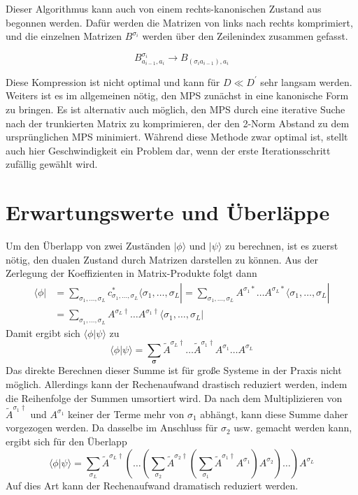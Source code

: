 \documentclass[10pt,a4paper]{report}
\newcommand{\SumIndex}{\sigma_1,\ldots,\sigma_L}
\begin{document}
Dieser Algorithmus kann auch von einem rechts-kanonischen Zustand aus begonnen werden. Dafür werden die Matrizen von links nach rechts komprimiert, und die einzelnen Matrizen $B^{\sigma_i}$ werden über den Zeilenindex zusammen gefasst.

\begin{equation}
B_{a_{i-1},a_{i}}^{\sigma_i}\rightarrow B_{(\sigma_i a_{i-1}),a_i}
\end{equation}

Diese Kompression ist nicht optimal und kann für $D\ll D^\prime$ sehr langsam werden. Weiters ist es im allgemeinen nötig, den MPS zunächst in eine kanonische Form zu bringen. Es ist alternativ auch möglich, den MPS durch eine iterative Suche nach der trunkierten Matrix zu komprimieren, der den 2-Norm Abstand zu dem ursprünglichen MPS minimiert. Während diese Methode zwar optimal ist, stellt auch hier Geschwindigkeit ein Problem dar, wenn der erste Iterationsschritt zufällig gewählt wird.

\section{Erwartungswerte und Überläppe}\label{MPO}
Um den Überlapp von zwei Zuständen $|\phi\rangle$ und $|\psi\rangle$ zu berechnen, ist es zuerst nötig, den dualen Zustand durch Matrizen darstellen zu können. Aus der Zerlegung der Koeffizienten in Matrix-Produkte folgt dann
\begin{equation}
\begin{split}
\langle\phi|&=\sum_{\SumIndex}c_{\SumIndex}^{\ast}\langle\SumIndex|=\sum_{\SumIndex} A^{\sigma_1\ast}\ldots A^{\sigma_L \ast}\langle\SumIndex|\\
 &= \sum_{\SumIndex}A^{\sigma_L\dagger}\ldots A^{\sigma_1 \dagger}\langle\SumIndex|
\end{split}
\end{equation}
Damit ergibt sich $\langle\phi|\psi\rangle$ zu 
\begin{equation}
\langle\phi|\psi\rangle=\sum_{\bm{\sigma}}\tilde{A}^{\sigma_L \dagger}\ldots\tilde{A}^{\sigma_1 \dagger} A^{\sigma_1}\ldots A^{\sigma_L} 
\end{equation}
Das direkte Berechnen dieser Summe ist für große Systeme in der Praxis nicht möglich. Allerdings kann der Rechenaufwand drastisch reduziert werden, indem die Reihenfolge der Summen umsortiert wird. Da nach dem Multiplizieren von $\tilde{A}^{\sigma_1\dagger}$ und $A^{\sigma_1}$ keiner der Terme mehr von $\sigma_1$ abhängt, kann diese Summe daher vorgezogen werden. Da dasselbe im Anschluss für $\sigma_2$ usw. gemacht werden kann, ergibt sich für den Überlapp
\begin{equation}
\langle\phi|\psi\rangle=\sum_{\sigma_L}\tilde{A}^{\sigma_L\dagger}(\ldots(\sum_{\sigma_2}\tilde{A}^{\sigma_2\dagger}(\sum_{\sigma_1}\tilde{A}^{\sigma_1\dagger}A^{\sigma_1})A^{\sigma_2})\ldots)A^{\sigma_L}
\end{equation}
Auf dies Art kann der Rechenaufwand dramatisch reduziert werden.\\
\end{document}
